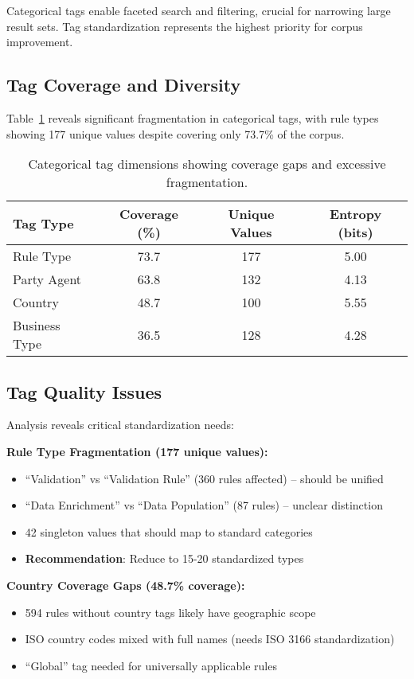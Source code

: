 Categorical tags enable faceted search and filtering, crucial for narrowing large result sets. Tag standardization represents the highest priority for corpus improvement.

\subsection{Tag Coverage and Diversity}

Table~\ref{tab:tag-coverage} reveals significant fragmentation in categorical tags, with rule types showing 177 unique values despite covering only 73.7\% of the corpus.

\begin{table}[h]
\centering
\begin{tabular}{lccc}
\toprule
\textbf{Tag Type} & \textbf{Coverage (\%)} & \textbf{Unique Values} & \textbf{Entropy (bits)} \\
\midrule
Rule Type & 73.7 & 177 & 5.00 \\
Party Agent & 63.8 & 132 & 4.13 \\
Country & 48.7 & 100 & 5.55 \\
Business Type & 36.5 & 128 & 4.28 \\
\bottomrule
\end{tabular}
\caption{Categorical tag dimensions showing coverage gaps and excessive fragmentation.}
\label{tab:tag-coverage}
\end{table}

\subsection{Tag Quality Issues}

Analysis reveals critical standardization needs:

\textbf{Rule Type Fragmentation (177 unique values):}
\begin{itemize}[leftmargin=*,itemsep=2pt,topsep=2pt]
 \item ``Validation'' vs ``Validation Rule'' (360 rules affected) -- should be unified
 \item ``Data Enrichment'' vs ``Data Population'' (87 rules) -- unclear distinction
 \item 42 singleton values that should map to standard categories
 \item \textbf{Recommendation}: Reduce to 15-20 standardized types
\end{itemize}

\textbf{Country Coverage Gaps (48.7\% coverage):}
\begin{itemize}[leftmargin=*,itemsep=2pt,topsep=2pt]
 \item 594 rules without country tags likely have geographic scope
 \item ISO country codes mixed with full names (needs ISO 3166 standardization)
 \item ``Global'' tag needed for universally applicable rules
\end{itemize}

